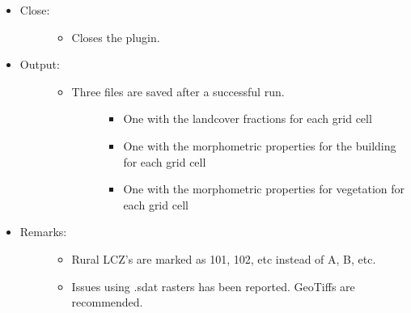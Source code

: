 \documentclass[letterpaper,10pt,english]{sphinxmanual}
\begin{document}
\begin{itemize}
\begin{description}
\begin{itemize}
\end{itemize}

\end{description}

\item {} \begin{description}
\item[{Close:}] \leavevmode\begin{itemize}
\item {} 
Closes the plugin.

\end{itemize}

\end{description}

\item {} \begin{description}
\item[{Output:}] \leavevmode\begin{itemize}
\item {} \begin{description}
\item[{Three files are saved after a successful run.}] \leavevmode\begin{itemize}
\item {} 
One with the landcover fractions for each grid cell

\item {} 
One with the morphometric properties for the building for each grid cell

\item {} 
One with the morphometric properties for vegetation for each grid cell

\end{itemize}

\end{description}

\end{itemize}

\end{description}

\item {} \begin{description}
\item[{Remarks:}] \leavevmode\begin{itemize}
\item {} 
Rural LCZ’s are marked as 101, 102, etc instead of A, B, etc.

\item {} 
Issues using .sdat rasters has been reported. GeoTiffs are recommended.


\end{itemize}
\end{description}
\end{itemize}
\end{document}
